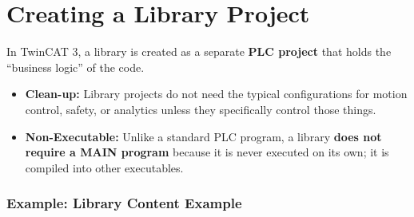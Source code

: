 \documentclass[11pt,a4paper]{article}
\begin{document}
\section{Creating a Library Project}

In TwinCAT 3, a library is created as a separate \textbf{PLC project} that holds the ``business logic'' of the code.

\begin{itemize}[leftmargin=*]
    \item \textbf{Clean-up:} Library projects do not need the typical configurations for motion control, safety, or analytics unless they specifically control those things.
    \item \textbf{Non-Executable:} Unlike a standard PLC program, a library \textbf{does not require a MAIN program} because it is never executed on its own; it is compiled into other executables.
\end{itemize}

\subsubsection*{Example: Library Content Example}
\end{document}
